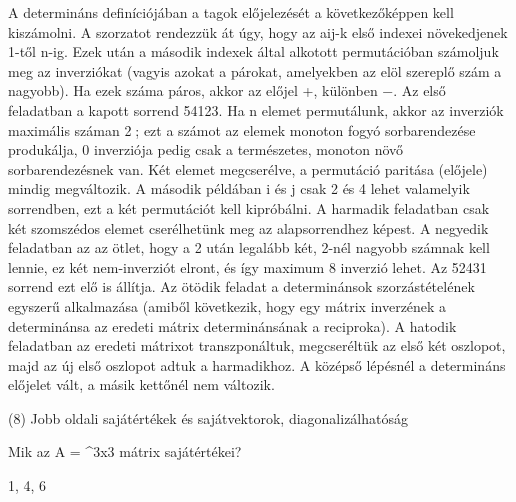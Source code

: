 \begin{frame}
  \begin{tcolorbox}[title={7/6. -R-}]
    A determináns deﬁníciójában a tagok előjelezését a következőképpen kell kiszámolni. A szorzatot rendezzük át úgy, hogy az aij-k első indexei növekedjenek 1-től n-ig. Ezek után a második indexek által alkotott permutációban számoljuk meg az inverziókat (vagyis azokat a párokat, amelyekben az elöl szereplő szám a nagyobb). Ha ezek száma páros, akkor az előjel +, különben −. Az első feladatban a kapott sorrend 54123. Ha n elemet permutálunk, akkor az inverziók maximális száman 2; ezt a számot az elemek monoton fogyó sorbarendezése produkálja, 0 inverziója pedig csak a természetes, monoton növő sorbarendezésnek van. Két elemet megcserélve, a permutáció paritása (előjele) mindig megváltozik. A második példában i és j csak 2 és 4 lehet valamelyik sorrendben, ezt a két permutációt kell kipróbálni. A harmadik feladatban csak két szomszédos elemet cserélhetünk meg az alapsorrendhez képest. A negyedik feladatban az az ötlet, hogy a 2 után legalább két, 2-nél nagyobb számnak kell lennie, ez két nem-inverziót elront, és így maximum 8 inverzió lehet. Az 52431 sorrend ezt elő is állítja. Az ötödik feladat a determinánsok szorzástételének egyszerű alkalmazása (amiből következik, hogy egy mátrix inverzének a determinánsa az eredeti mátrix determinánsának a reciproka). A hatodik feladatban az eredeti mátrixot transzponáltuk, megcseréltük az első két oszlopot, majd az új első oszlopot adtuk a harmadikhoz. A középső lépésnél a determináns előjelet vált, a másik kettőnél nem változik.

  \end{tcolorbox}
\end{frame}


\begin{frame}[plain]
\begin{tcolorbox}[center, colback={myyellow}, coltext={black}, colframe={myyellow}]
    {\RHuge  (8) Jobb oldali sajátértékek és sajátvektorok, diagonalizálhatóság}
    \mmedskip
\end{tcolorbox}
\end{frame}

\begin{frame}
  \begin{tcolorbox}[title={8/1. -N-}]
    Mik az A = ^3x3 mátrix sajátértékei? 

  \tcblower

    \mmedskip 
    
    1, 4, 6
  \end{tcolorbox}
\end{frame}


